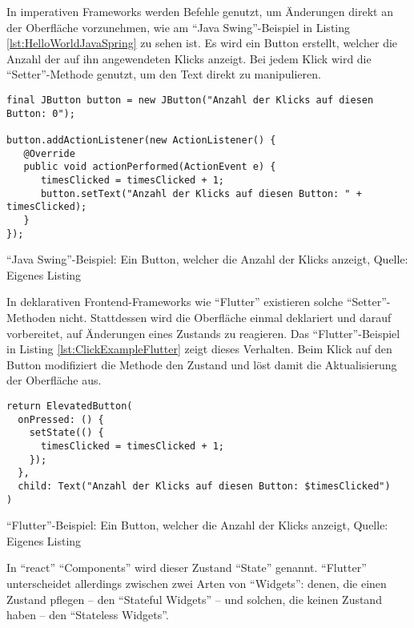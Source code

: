\clearpage
In imperativen Frameworks werden Befehle genutzt, um Änderungen direkt an der Oberfläche vorzunehmen,
wie am \enquote{Java Swing}-Beispiel in Listing \ref{lst:HelloWorldJavaSpring} zu sehen ist.
Es wird ein Button erstellt, welcher die Anzahl der auf ihn angewendeten Klicks anzeigt.
Bei jedem Klick wird die \enquote{Setter}-Methode  genutzt, um den Text direkt zu manipulieren.

\ifIncludeFigures
  \begin{listing}[h]
    \begin{verbatim}
final JButton button = new JButton("Anzahl der Klicks auf diesen Button: 0");

button.addActionListener(new ActionListener() {
   @Override
   public void actionPerformed(ActionEvent e) { 
      timesClicked = timesClicked + 1;
      button.setText("Anzahl der Klicks auf diesen Button: " + timesClicked);
   }
});
\end{verbatim}
    \caption[\enquote{Java Swing}-Beispiel: Ein Button, welcher die Anzahl der Klicks anzeigt]{\enquote{Java Swing}-Beispiel: Ein Button, welcher die Anzahl der Klicks anzeigt, Quelle: Eigenes Listing}
    \label{lst:HelloWorldJavaSpring}
  \end{listing}
\fi

In deklarativen Frontend-Frameworks wie \enquote{Flutter} existieren solche \enquote{Setter}-Methoden nicht.
Stattdessen wird die Oberfläche einmal deklariert und darauf vorbereitet, auf Änderungen eines Zustands zu reagieren.
Das \enquote{Flutter}-Beispiel in Listing \ref{lst:ClickExampleFlutter} zeigt dieses Verhalten.
Beim Klick auf den Button modifiziert die Methode  den Zustand und löst damit die Aktualisierung der Oberfläche aus.

\ifIncludeFigures
  \begin{listing}[h]
    \begin{verbatim}
return ElevatedButton(
  onPressed: () {
    setState(() {
      timesClicked = timesClicked + 1;
    });
  },
  child: Text("Anzahl der Klicks auf diesen Button: $timesClicked")
)
\end{verbatim}
    \caption[\enquote{Flutter}-Beispiel: Ein Button, welcher die Anzahl der Klicks anzeigt]{\enquote{Flutter}-Beispiel: Ein Button, welcher die Anzahl der Klicks anzeigt, Quelle: Eigenes Listing}
    \label{lst:ClickExampleFlutter}
  \end{listing}
\fi

In \enquote{react} \enquote{Components} wird dieser Zustand \enquote{State} genannt.
\enquote{Flutter} unterscheidet allerdings zwischen zwei Arten von \enquote{Widgets}: denen, die einen Zustand pflegen -- den \enquote{Stateful Widgets} -- und solchen, die keinen Zustand haben -- den \enquote{Stateless Widgets}.

